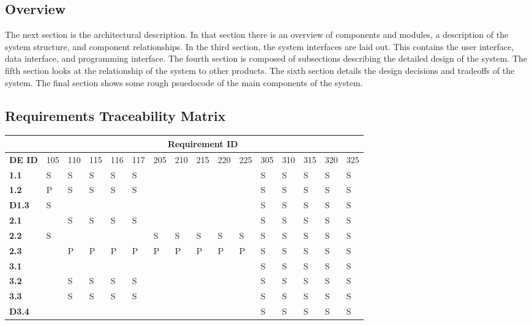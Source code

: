 \documentclass{article}
\begin{document}
\subsection{Overview}
The next section is the architectural description. In that section there is
an overview of components and modules, a description of the system
structure, and component relationships. In the third section, the system
interfaces are laid out. This contains the user interface, data interface,
and programming interface. The fourth section is composed of subsections
describing the detailed design of the system. The fifth section looks at the
relationship of the system to other products. The sixth section details the
design decisions and tradeoffs of the system. The final section shows some
rough psuedocode of the main components of the system.

\subsection{Requirements Traceability Matrix}
\begin{tabular}{ | l | l | l | l | l | l | l | l | l | l | l | l | l | l | l | l |}
\hline
& \multicolumn{15}{|c|}{\textbf{Requirement ID}} \\ \hline
\textbf{DE ID}
             & 105 & 110 & 115 & 116 & 117 & 205 & 210 & 215 & 220 & 225 & 305 & 310 & 315 & 320 & 325 \\ \hline
\textbf{1.1} &   S &   S &   S &   S &   S &     &     &     &     &     &   S &   S &   S &   S &   S \\ \hline
\textbf{1.2} &   P &   S &   S &   S &   S &     &     &     &     &     &   S &   S &   S &   S &   S \\ \hline
\textbf{D1.3}&   S &     &     &     &     &     &     &     &     &     &   S &   S &   S &   S &   S \\ \hline
\textbf{2.1} &     &   S &   S &   S &   S &     &     &     &     &     &   S &   S &   S &   S &   S \\ \hline
\textbf{2.2} &   S &     &     &     &     &   S &   S &   S &   S &   S &   S &   S &   S &   S &   S \\ \hline
\textbf{2.3} &     &   P &   P &   P &   P &   P &   P &   P &   P &   P &   S &   S &   S &   S &   S \\ \hline
\textbf{3.1} &     &     &     &     &     &     &     &     &     &     &   S &   S &   S &   S &   S \\ \hline
\textbf{3.2} &     &   S &   S &   S &   S &     &     &     &     &     &   S &   S &   S &   S &   S \\ \hline
\textbf{3.3} &     &   S &   S &   S &   S &     &     &     &     &     &   S &   S &   S &   S &   S \\ \hline
\textbf{D3.4}&     &     &     &     &     &     &     &     &     &     &   S &   S &   S &   S &   S \\ \hline
\end{tabular}
\end{document}
